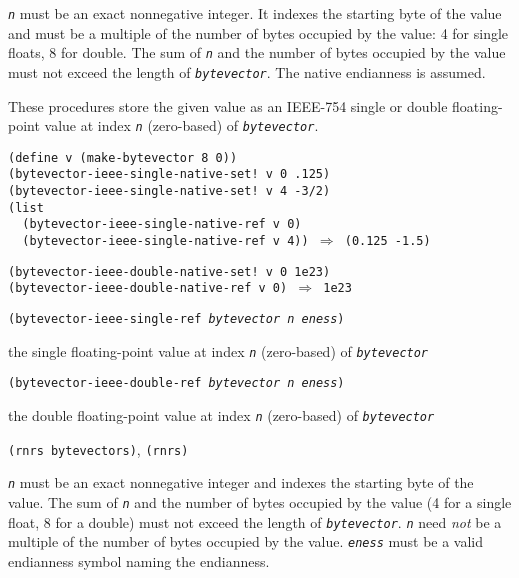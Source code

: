 \texttt{\textit{n}} must be an exact nonnegative integer.
It indexes the starting byte of the value and must be a multiple of the
number of bytes occupied by the value: 4 for single floats, 8 for double.
The sum of \texttt{\textit{n}} and the number of bytes occupied by the value must
not exceed the length of \texttt{\textit{bytevector}}.
The native endianness is assumed.

These procedures store the given value as an IEEE-754 single or
double floating-point value at index \texttt{\textit{n}} (zero-based) of \texttt{\textit{bytevector}}.


\begin{alltt}
(define v (make-bytevector 8 0))
(bytevector-ieee-single-native-set! v 0 .125)
(bytevector-ieee-single-native-set! v 4 -3/2)
(list
  (bytevector-ieee-single-native-ref v 0)
  (bytevector-ieee-single-native-ref v 4)) \(\Rightarrow\) (0.125 -1.5)

(bytevector-ieee-double-native-set! v 0 1e23)
(bytevector-ieee-double-native-ref v 0) \(\Rightarrow\) 1e23
\end{alltt}

\begin{description}

\label{objects_s264}\item[procedure] \texttt{(bytevector-ieee-single-ref \textit{bytevector} \textit{n} \textit{eness})}



\item[returns] the single floating-point value at index \texttt{\textit{n}} (zero-based) of \texttt{\textit{bytevector}} 


\item[procedure] \texttt{(bytevector-ieee-double-ref \textit{bytevector} \textit{n} \textit{eness})}



\item[returns] the double floating-point value at index \texttt{\textit{n}} (zero-based) of \texttt{\textit{bytevector}} 


\item[libraries] \texttt{(rnrs bytevectors)}, \texttt{(rnrs)}
\end{description}

\texttt{\textit{n}} must be an exact nonnegative integer and
indexes the starting byte of the value.
The sum of \texttt{\textit{n}} and the number of bytes occupied by the value
(4 for a single float, 8 for a double)
must not exceed the length of \texttt{\textit{bytevector}}.
\texttt{\textit{n}} need \textit{not} be a multiple of the
number of bytes occupied by the value.
\texttt{\textit{eness}} must be a valid endianness symbol naming the endianness.

